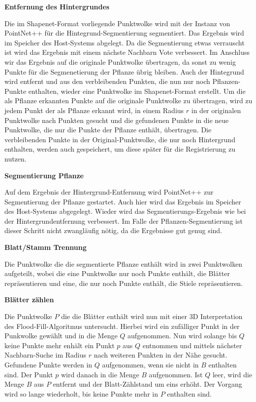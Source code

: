 \documentclass[12pt,titlepage, twoside]{article}
\begin{document}
\textbf{Entfernung des Hintergrundes}

Die im Shapenet-Format vorliegende Punktwolke wird mit der Instanz von PointNet++ für die Hintegrund-Segmentierung segmentiert. Das Ergebnis wird im Speicher des Host-Systems abgelegt.
Da die Segmentierung etwas verrauscht ist wird das Ergebnis mit einem nächste Nachbarn Vote verbessert.
Im Anschluss wir das Ergebnis auf die originale Punktwolke übertragen, da sonst zu wenig Punkte für die Segmenetierung der Pflanze übrig bleiben.
Auch der Hintegrund wird entfernt und aus den verbleibenden Punkten, die nun nur noch Pflanzen-Punkte enthalten, wieder eine Punktwolke im Shapenet-Format erstellt.
Um die als Pflanze erkannten Punkte auf die originale Punktwolke zu übertragen, wird zu jedem Punkt der als Pflanze erkannt wird, in einem Radius $r$ in der originalen Punktwolke nach Punkten gesucht 
und die gefundenen Punkte in die neue Punktwolke, die nur die Punkte der Pflanze enthält, übertragen. 
Die verbleibenden Punkte in der Original-Punktwolke, die nur noch Hintergrund enthalten, werden auch gespeichert, um diese später für die Registrierung zu nutzen.


\textbf{Segmentierung Pflanze}

Auf dem Ergebnis der Hintergrund-Entfernung wird PointNet++ zur Segmentierung der Pflanze gestartet. Auch hier wird das Ergebnis im Speicher des Host-Systems abgegelegt. 
Wieder wird das Segmentierungs-Ergebnis wie bei der Hintergrundentfernung verbessert. Im Falle der Pflanzen-Segmentierung ist dieser Schritt nicht zwangläufig nötig, da die Ergebnisse gut genug sind.

\textbf{Blatt/Stamm Trennung}

Die Punktwolke die die segmentierte Pflanze enthält wird in zwei Punktwolken aufgeteilt, 
wobei die eine Punktwolke nur noch Punkte enthält, die Blätter repräsentieren und eine, die nur noch Punkte enthält, die Stiele repräsentieren.

\textbf{Blätter zählen}

Die Punktwolke $P$ die die Blätter enthält wird nun mit einer 3D Interpretation des Flood-Fill-Algoritmus untersucht. Hierbei wird ein zufälliger Punkt in der Punkwolke gewählt und in die Menge $Q$ aufgenommen.
Nun wird solange bis $Q$ keine Punkte mehr enhält ein Punkt $p$ aus $Q$ entnommen und mittels nächster Nachbarn-Suche im Radius $r$ nach weiteren Punkten in der Nähe gesucht. Gefundene Punkte werden in $Q$ aufgenommen, wenn sie nicht in $B$ enthalten sind.
Der Punkt $p$ wird danach in die Menge $B$ aufgenommen. Ist $Q$ leer, wird die Menge $B$ aus $P$ entfernt und der Blatt-Zählstand um eins erhöht. 
Der Vorgang wird so lange wiederholt, bis keine Punkte mehr in $P$ enthalten sind.
\end{document}
